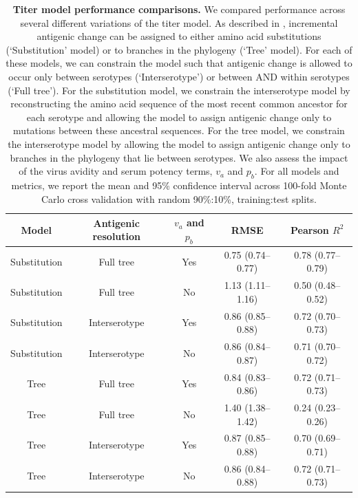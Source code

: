 \documentclass[11pt,oneside,letterpaper]{article}
\begin{document}
\begin{table}[ht]
  \centering
  \caption{
    \textbf{Titer model performance comparisons.}
    We compared performance across several different variations of the titer model.
    As described in \citet{neher2016prediction}, incremental antigenic change can be assigned to either amino acid substitutions (`Substitution' model) or to branches in the phylogeny (`Tree' model).
    For each of these models, we can constrain the model such that antigenic change is allowed to occur only between serotypes (`Interserotype') or between AND within serotypes (`Full tree').
    For the substitution model, we constrain the interserotype model by reconstructing the amino acid sequence of the most recent common ancestor for each serotype and allowing the model to assign antigenic change only to mutations between these ancestral sequences.
    For the tree model, we constrain the interserotype model by allowing the model to assign antigenic change only to branches in the phylogeny that lie between serotypes.
    We also assess the impact of the virus avidity and serum potency terms, $v_a$ and $p_b$.
    For all models and metrics, we report the mean and 95\% confidence interval across 100-fold Monte Carlo cross validation with random 90\%:10\%, training:test splits.
  }
  \label{titer_model_performance}
  \begin{tabular}[ht]{ c c c c c }
    Model         & Antigenic resolution  & $v_a$ and $p_b$ & RMSE              & Pearson $R^2$ \\
    \hline
    Substitution  & Full tree             & Yes             & 0.75 (0.74--0.77) & 0.78 (0.77--0.79) \\
    Substitution  & Full tree             & No              & 1.13 (1.11--1.16) & 0.50 (0.48--0.52) \\
    Substitution  & Interserotype         & Yes             & 0.86 (0.85--0.88) & 0.72 (0.70--0.73) \\
    Substitution  & Interserotype         & No              & 0.86 (0.84--0.87) & 0.71 (0.70--0.72) \\
    Tree          & Full tree             & Yes             & 0.84 (0.83--0.86) & 0.72 (0.71--0.73) \\
    Tree          & Full tree             & No              & 1.40 (1.38--1.42) & 0.24 (0.23--0.26) \\
    Tree          & Interserotype         & Yes             & 0.87 (0.85--0.88) & 0.70 (0.69--0.71) \\
    Tree          & Interserotype         & No              & 0.86 (0.84--0.88) & 0.72 (0.71--0.73) \\
    \hline
  \end{tabular}
\end{table}
\end{document}
